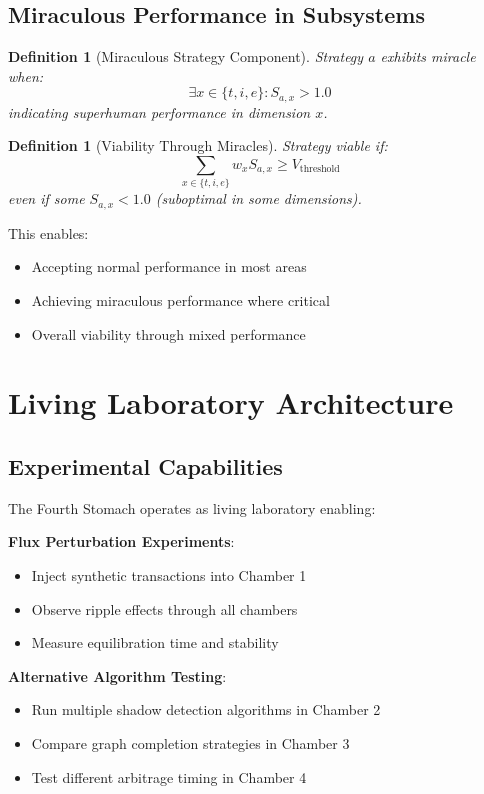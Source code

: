 \documentclass[12pt]{article}
\newtheorem{definition}[theorem]{Definition}
\begin{document}
\subsection{Miraculous Performance in Subsystems}

\begin{definition}[Miraculous Strategy Component]
Strategy $a$ exhibits miracle when:
$$
\exists x \in \{t,i,e\} : S_{a,x} > 1.0
$$
indicating superhuman performance in dimension $x$.
\end{definition}

\begin{definition}[Viability Through Miracles]
Strategy viable if:
$$
\sum_{x \in \{t,i,e\}} w_x S_{a,x} \geq V_{\text{threshold}}
$$
even if some $S_{a,x} < 1.0$ (suboptimal in some dimensions).
\end{definition}

This enables:
\begin{itemize}
    \item Accepting normal performance in most areas
    \item Achieving miraculous performance where critical
    \item Overall viability through mixed performance
\end{itemize}

\section{Living Laboratory Architecture}

\subsection{Experimental Capabilities}

The Fourth Stomach operates as living laboratory enabling:

\textbf{Flux Perturbation Experiments}:
\begin{itemize}
    \item Inject synthetic transactions into Chamber 1
    \item Observe ripple effects through all chambers
    \item Measure equilibration time and stability
\end{itemize}

\textbf{Alternative Algorithm Testing}:
\begin{itemize}
    \item Run multiple shadow detection algorithms in Chamber 2
    \item Compare graph completion strategies in Chamber 3
    \item Test different arbitrage timing in Chamber 4
\end{itemize}
\end{document}
